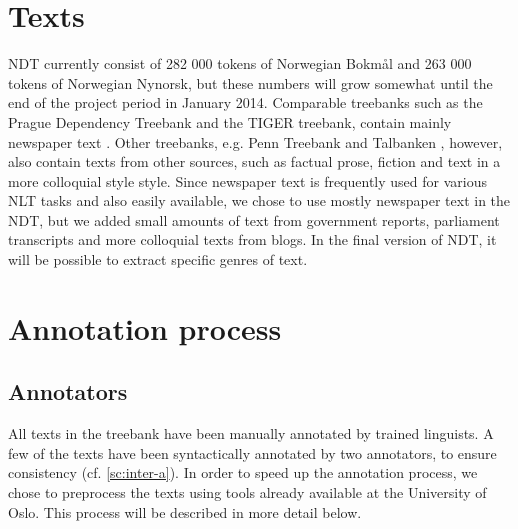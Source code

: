 \documentclass[11pt,a4paper]{article}
\begin{document}

\section{Texts}
NDT currently consist of 282 000 tokens of Norwegian Bokmål and 263 000 tokens of Norwegian Nynorsk, but these numbers will grow somewhat until the end of the project period in January 2014. Comparable treebanks such as the Prague Dependency Treebank and the TIGER treebank, contain mainly newspaper text \cite{Boh:Haj:Hla:2003,Bra:2004}. Other treebanks, e.g. Penn Treebank and Talbanken \cite{Mar:San:Mar:93,Niv:Nil:Hal:2006}, however, also contain texts from other sources, such as factual prose, fiction and text in a more colloquial style style. Since newspaper text is frequently used for various NLT tasks and also easily available, we chose to use mostly newspaper text in the NDT, but we added small amounts of text from government reports, parliament transcripts and more colloquial texts from blogs. In the final version of NDT, it will be possible to extract specific genres of text.



\section{Annotation process}
\subsection{Annotators}
All texts in the treebank have been manually annotated by trained linguists. A few of the texts have been syntactically annotated by two annotators, to ensure consistency (cf. \ref{sc:inter-a}). In order to speed up the annotation process, we chose to preprocess the texts using tools already available at the University of Oslo. This process will be described in more detail below.
\end{document}
